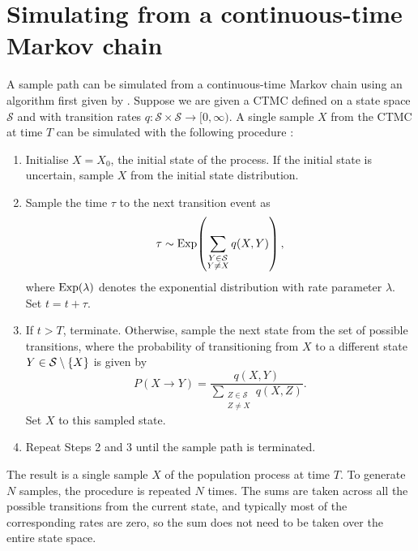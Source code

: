 \section{Simulating from a continuous-time Markov chain}\label{app:ctmc_sim}
A sample path can be simulated from a continuous-time Markov chain using an algorithm first given by \citet{Gillespie_1977_ExactStochasticSimulation}.
Suppose we are given a CTMC defined on a state space \(\mathcal{S}\) and with transition rates \(q\colon \mathcal{S} \times \mathcal{S} \to [0,\infty)\).
A single sample \(X\) from the CTMC at time \(T\) can be simulated with the following procedure \citep{Gillespie_1977_ExactStochasticSimulation}:
\begin{enumerate}
	\item Initialise \(X = X_0\), the initial state of the process.
	      If the initial state is uncertain, sample \(X\) from the initial state distribution.

	\item Sample the time \(\tau\) to the next transition event as
	      \[
		      \tau \sim\mathrm{Exp}\!\left(\sum_{\substack{Y \in \mathcal{S} \\ Y \neq X}}{q\!\left(X, Y\right)}\right),
	      \]
	      where \(\mathrm{Exp}\!\left(\lambda\right)\) denotes the exponential distribution with rate parameter \(\lambda\).
	      Set \(t = t + \tau\).

	\item If \(t > T\), terminate.
	      Otherwise, sample the next state from the set of possible transitions, where the probability of transitioning from \(X\) to a different state \(Y \in \mathcal{S}\setminus \set{X}\) is given by
	      \[
					P\!\left(X \to Y\right) = \frac{q\!\left(X, Y\right)}{\sum_{\substack{Z \in \mathcal{S} \\ Z \neq X}}{q\!\left(X, Z\right)}}.
	      \]
	      Set \(X\) to this sampled state.

	\item Repeat Steps 2 and 3 until the sample path is terminated.

\end{enumerate}
The result is a single sample \(X\) of the population process at time \(T\).
To generate \(N\) samples, the procedure is repeated \(N\) times.
The sums are taken across all the possible transitions from the current state, and typically most of the corresponding rates are zero, so the sum does not need to be taken over the entire state space.


